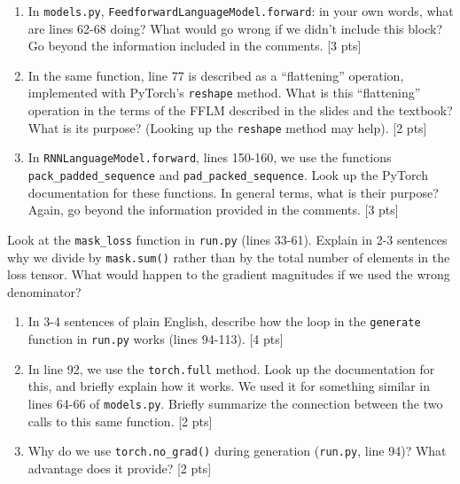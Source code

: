 \documentclass[11pt]{article}
\begin{document}
\vspace{2em}
\begin{enumerate}[label=\alph*., itemsep=2em]
  \item In \texttt{models.py}, \texttt{FeedforwardLanguageModel.forward}: in your own words, what are lines 62-68 doing? What would go wrong if we didn't include this block? Go beyond the information included in the comments. [3 pts]
  \item In the same function, line 77 is described as a ``flattening'' operation, implemented with PyTorch's \texttt{reshape} method. What is this ``flattening'' operation in the terms of the FFLM described in the slides and the textbook? What is its purpose? (Looking up the \texttt{reshape} method may help). [2 pts]
  \item In \texttt{RNNLanguageModel.forward}, lines 150-160, we use the functions \texttt{pack\_padded\_sequence} and \texttt{pad\_packed\_sequence}. Look up the PyTorch documentation for these functions. In general terms, what is their purpose? Again, go beyond the information provided in the comments. [3 pts]
\end{enumerate}

\vspace{2em}
 Look at the \texttt{mask\_loss} function in \texttt{run.py} (lines 33-61). Explain in 2-3 sentences why we divide by \texttt{mask.sum()} rather than by the total number of elements in the loss tensor. What would happen to the gradient magnitudes if we used the wrong denominator?

\vspace{2em}
\begin{enumerate}[label=\alph*., itemsep=2em]
  \item In 3-4 sentences of plain English, describe how the loop in the \texttt{generate} function in \texttt{run.py} works (lines 94-113). [4 pts]
  \item In line 92, we use the \texttt{torch.full} method. Look up the documentation for this, and briefly explain how it works. We used it for something similar in lines 64-66 of \texttt{models.py}. Briefly summarize the connection between the two calls to this same function. [2 pts]
  \item Why do we use \texttt{torch.no\_grad()} during generation (\texttt{run.py}, line 94)? What advantage does it provide? [2 pts]
\end{enumerate}
\end{document}
